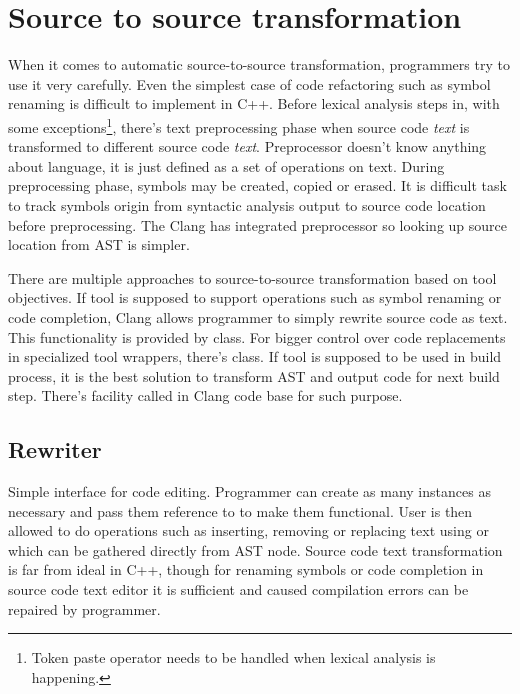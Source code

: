 \section{Source to source transformation}
When it comes to automatic source-to-source transformation, programmers try to use it very carefully. Even the simplest case of code refactoring such as symbol renaming is difficult to implement in C++. Before lexical analysis steps in, with some exceptions\footnote{Token paste operator \code{\#\#} needs to be handled when lexical analysis is happening.}, there's text preprocessing phase when source code \emph{text} is transformed to different source code \emph{text}. Preprocessor doesn't know anything about language, it is just defined as a set of operations on text. During preprocessing phase, symbols may be created, copied or erased. It is difficult task to track symbols origin from syntactic analysis output to source code location before preprocessing. The Clang has integrated preprocessor so looking up source location from AST is simpler.

There are multiple approaches to source-to-source transformation based on tool objectives. If tool is supposed to support operations such as symbol renaming or code completion, Clang allows programmer to simply rewrite source code as text. This functionality is provided by  class. For bigger control over code replacements in specialized tool wrappers, there's  class. If tool is supposed to be used in build process, it is the best solution to transform AST and output code for next build step. There's facility called  in Clang code base for such purpose.

\subsection{Rewriter}
Simple interface for code editing. Programmer can create as many instances as necessary and pass them reference to  to make them functional.  User is then allowed to do operations such as inserting, removing or replacing text using  or  which can be gathered directly from AST node. Source code text transformation is far from ideal in C++, though for renaming symbols or code completion in source code text editor it is sufficient and caused compilation errors can be repaired by programmer.

